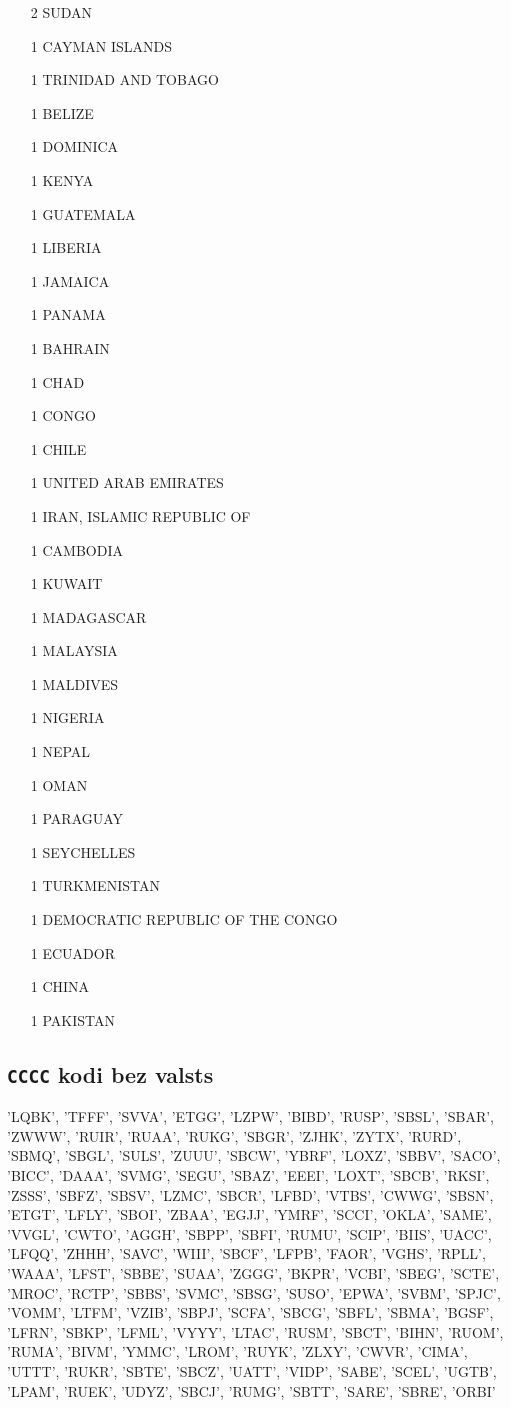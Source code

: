 \documentclass[12pt,a4paper]{article}
\begin{document}
\begin{multicols*}{3}
\begin{itemize}
\item[2] SUDAN
\item[1] CAYMAN ISLANDS
\item[1] TRINIDAD AND TOBAGO
\item[1] BELIZE
\item[1] DOMINICA
\item[1] KENYA
\item[1] GUATEMALA
\item[1] LIBERIA
\item[1] JAMAICA
\item[1] PANAMA
\item[1] BAHRAIN
\item[1] CHAD
\item[1] CONGO
\item[1] CHILE
\item[1] UNITED ARAB EMIRATES
\item[1] IRAN, ISLAMIC REPUBLIC OF
\item[1] CAMBODIA
\item[1] KUWAIT
\item[1] MADAGASCAR
\item[1] MALAYSIA
\item[1] MALDIVES
\item[1] NIGERIA
\item[1] NEPAL
\item[1] OMAN
\item[1] PARAGUAY
\item[1] SEYCHELLES
\item[1] TURKMENISTAN
\item[1] DEMOCRATIC REPUBLIC OF THE CONGO
\item[1] ECUADOR
\item[1] CHINA
\item[1] PAKISTAN
    \end{itemize}
\end{multicols*}

\subsection*{\texttt{CCCC} kodi bez valsts}
'LQBK', 'TFFF', 'SVVA', 'ETGG', 'LZPW', 'BIBD', 'RUSP', 'SBSL', 'SBAR', 'ZWWW', 'RUIR', 'RUAA', 'RUKG', 'SBGR', 'ZJHK', 'ZYTX', 'RURD', 'SBMQ', 'SBGL', 'SULS', 'ZUUU', 'SBCW', 'YBRF', 'LOXZ', 'SBBV', 'SACO', 'BICC', 'DAAA', 'SVMG', 'SEGU', 'SBAZ', 'EEEI', 'LOXT', 'SBCB', 'RKSI', 'ZSSS', 'SBFZ', 'SBSV', 'LZMC', 'SBCR', 'LFBD', 'VTBS', 'CWWG', 'SBSN', 'ETGT', 'LFLY', 'SBOI', 'ZBAA', 'EGJJ', 'YMRF', 'SCCI', 'OKLA', 'SAME', 'VVGL', 'CWTO', 'AGGH', 'SBPP', 'SBFI', 'RUMU', 'SCIP', 'BIIS', 'UACC', 'LFQQ', 'ZHHH', 'SAVC', 'WIII', 'SBCF', 'LFPB', 'FAOR', 'VGHS', 'RPLL', 'WAAA', 'LFST', 'SBBE', 'SUAA', 'ZGGG', 'BKPR', 'VCBI', 'SBEG', 'SCTE', 'MROC', 'RCTP', 'SBBS', 'SVMC', 'SBSG', 'SUSO', 'EPWA', 'SVBM', 'SPJC', 'VOMM', 'LTFM', 'VZIB', 'SBPJ', 'SCFA', 'SBCG', 'SBFL', 'SBMA', 'BGSF', 'LFRN', 'SBKP', 'LFML', 'VYYY', 'LTAC', 'RUSM', 'SBCT', 'BIHN', 'RUOM', 'RUMA', 'BIVM', 'YMMC', 'LROM', 'RUYK', 'ZLXY', 'CWVR', 'CIMA', 'UTTT', 'RUKR', 'SBTE', 'SBCZ', 'UATT', 'VIDP', 'SABE', 'SCEL', 'UGTB', 'LPAM', 'RUEK', 'UDYZ', 'SBCJ', 'RUMG', 'SBTT', 'SARE', 'SBRE', 'ORBI'
\end{document}
